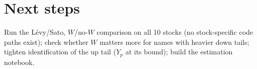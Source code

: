 \documentclass[11pt]{article}
\begin{document}
\section{Next steps}
Run the Lévy/Sato, $W$/no-$W$ comparison on all 10 stocks (no stock-specific code paths exist); check whether
$W$ matters more for names with heavier down tails; tighten identification of the up tail ($Y_p$ at its bound);
build the estimation notebook.
\end{document}
